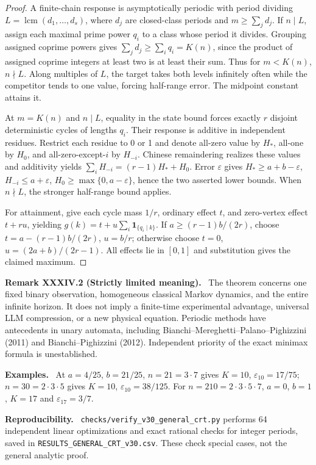 \documentclass[11pt,a4paper,oneside]{book}
\newcommand{\one}{\mathbf 1}\newcommand{\ii}{\mathrm i}\newcommand{\dd}{\mathrm d}
\DeclareMathOperator{\lcm}{lcm}\DeclareMathOperator{\spanR}{span_{\mathbb R}}
\newcommand{\statement}[3]{\par\medskip\noindent\textbf{#1 #2 (#3).}\ }
\newcommand{\note}[1]{\par\medskip\noindent\textbf{#1}\ }
\begin{document}
\begin{proof}A finite-chain response is asymptotically periodic with period dividing $L=\lcm(d_1,\ldots,d_s)$, where $d_j$ are closed-class periods and $m\ge\sum_jd_j$. If $n\mid L$, assign each maximal prime power $q_i$ to a class whose period it divides. Grouping assigned coprime powers gives $\sum_jd_j\ge\sum_iq_i=K(n)$, since the product of assigned coprime integers at least two is at least their sum. Thus for $m<K(n)$, $n\nmid L$. Along multiples of $L$, the target takes both levels infinitely often while the competitor tends to one value, forcing half-range error. The midpoint constant attains it.

At $m=K(n)$ and $n\mid L$, equality in the state bound forces exactly $r$ disjoint deterministic cycles of lengths $q_i$. Their response is additive in independent residues. Restrict each residue to 0 or 1 and denote all-zero value by $H_*$, all-one by $H_0$, and all-zero-except-$i$ by $H_{-i}$. Chinese remaindering realizes these values and additivity yields $\sum_iH_{-i}=(r-1)H_*+H_0$. Error $\varepsilon$ gives $H_*\ge a+b-\varepsilon$, $H_{-i}\le a+\varepsilon$, $H_0\ge\max\{0,a-\varepsilon\}$, hence the two asserted lower bounds. When $n\nmid L$, the stronger half-range bound applies.

For attainment, give each cycle mass $1/r$, ordinary effect $t$, and zero-vertex effect $t+ru$, yielding $g(k)=t+u\sum_i\one_{\{q_i\mid k\}}$. If $a\ge(r-1)b/(2r)$, choose $t=a-(r-1)b/(2r)$, $u=b/r$; otherwise choose $t=0$, $u=(2a+b)/(2r-1)$. All effects lie in $[0,1]$ and substitution gives the claimed maximum.\end{proof}
\statement{Remark}{XXXIV.2}{Strictly limited meaning} The theorem concerns one fixed binary observation, homogeneous classical Markov dynamics, and the entire infinite horizon. It does not imply a finite-time experimental advantage, universal LLM compression, or a new physical equation. Periodic methods have antecedents in unary automata, including Bianchi--Mereghetti--Palano--Pighizzini (2011) and Bianchi--Pighizzini (2012). Independent priority of the exact minimax formula is unestablished.
\note{Examples.} At $a=4/25$, $b=21/25$, $n=21=3\cdot7$ gives $K=10$, $\varepsilon_{10}=17/75$; $n=30=2\cdot3\cdot5$ gives $K=10$, $\varepsilon_{10}=38/125$. For $n=210=2\cdot3\cdot5\cdot7$, $a=0$, $b=1$, $K=17$ and $\varepsilon_{17}=3/7$.
\note{Reproducibility.} \texttt{checks/verify\_v30\_general\_crt.py} performs 64 independent linear optimizations and exact rational checks for integer periods, saved in \texttt{RESULTS\_GENERAL\_CRT\_v30.csv}. These check special cases, not the general analytic proof.
\setcounter{equation}{121}
\end{document}
